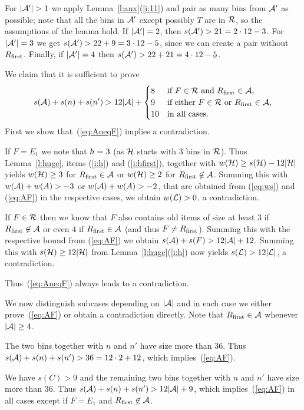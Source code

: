 For $|\Aprime|>1$ we apply Lemma~\ref{l:aux}(\ref{i:11}) and pair as
many bins from ${\mathcal A'}$ as possible; note that all the bins in
${\mathcal A'}$ except possibly $T$ are in ${\mathcal R}$, so the assumptions of
the lemma hold.  If $|{\mathcal A'}|=2$, then
$s({\mathcal A'})>21=2\cdot12-3$. For $|{\mathcal A'}|=3$ we get
$s({\mathcal A'})>22+9=3\cdot12-5$, since we can create a pair without
$R_{\mbox{\rm\scriptsize first}}$.  Finally, if $|{\mathcal A'}|=4$ then $s({\mathcal A'})>22+21=4\cdot
12-5$.

We claim that it is sufficient to prove
\begin{equation}
\label{eq:AF}
s({\mathcal A})+s(n)+s(n')>12|{\mathcal A}|+\begin{cases}
8 & \mbox{if $F\in{\mathcal R}$ and $R_{\mbox{\rm\scriptsize first}}\in{\mathcal A}$,} \\
9 & \mbox{if either $F\in{\mathcal R}$ or $R_{\mbox{\rm\scriptsize first}}\in{\mathcal A}$,} \\
10 & \mbox{in all cases.}
\end{cases}
\end{equation}
First we show that~(\ref{eq:AneqF}) implies a contradiction. 
 
If $F=E_1$ we note that ${h}=3$ (as ${\mathcal H}$ starts with $3$ bins
in ${\mathcal R}$). Thus Lemma~\ref{l:huge}, items (\ref{i:h}) and
(\ref{i:hfirst}), together with $w({\mathcal H})\geq s({\mathcal H})-12|{\mathcal H}|$
yields $w({\mathcal H})\geq 3$ for $R_{\mbox{\rm\scriptsize first}}\in{\mathcal A}$ or $w({\mathcal H})\geq 2$ for
$R_{\mbox{\rm\scriptsize first}}\not\in{\mathcal A}$. Summing this with $w({\mathcal A})+w(A)>-3$ or
$w({\mathcal A})+w(A)>-2$, that are obtained from (\ref{eq:ws}) and
(\ref{eq:AF}) in the respective cases, we obtain $w({\mathcal L})>0$, a
contradiction.

If $F\in{\mathcal R}$ then we know that $F$ also contains old items
of size at least 3 if $R_{\mbox{\rm\scriptsize first}}\not\in{\mathcal A}$ or even 4 if $R_{\mbox{\rm\scriptsize first}}\in{\mathcal A}$
(and thus $F\neq R_{\mbox{\rm\scriptsize first}}$). Summing this with the respective bound from
(\ref{eq:AF}) we obtain $s({\mathcal A})+s(F)>12|{\mathcal A}|+12$. Summing this
with $s({\mathcal H})\geq 12|{\mathcal H}|$ from Lemma~\ref{l:huge}(\ref{i:h}) now
yields $s({\mathcal L})>12|{\mathcal L}|$, a contradiction.

Thus~(\ref{eq:AneqF}) always leads to a contradiction. 

We now distinguish subcases depending on $|{\mathcal A}|$ and in each case we
either prove~(\ref{eq:AF}) or obtain a contradiction directly. 
Note that $R_{\mbox{\rm\scriptsize first}}\in{\mathcal A}$ whenever $|{\mathcal A}|\geq 4$. 

 The two bins together with $n$ and
$n'$ have size more than $36$. Thus
$s({\mathcal A})+s(n)+s(n')>36=12\cdot2+12$, which implies~(\ref{eq:AF}). 

 We have $s(C)>9$ and the remaining two
bins together with $n$ and $n'$ have size more than $36$. Thus
$s({\mathcal A})+s(n)+s(n')>12|{\mathcal A}|+9$, which implies~(\ref{eq:AF}) in all
cases except if $F=E_1$ and $R_{\mbox{\rm\scriptsize first}}\not\in{\mathcal A}$.  

